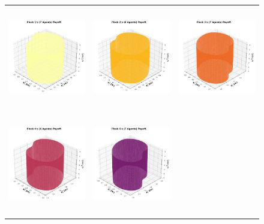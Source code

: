 \begin{figure}[tb!]
	\centering
	\begin{tabular}{ccc} 
		\includegraphics[height=12em,width=10em]{figures/flock_1.jpg} 
		&
		\includegraphics[height=12em,width=10em]{figures/flock_2.jpg} 
		& 
		\includegraphics[height=12em,width=10em]{figures/flock_3.jpg} 
		\\	
		\includegraphics[height=12em,width=10em]{figures/flock_4.jpg}
		&
		\includegraphics[height=12em,width=10em]{figures/flock_5.jpg} 

\end{tabular}
\end{figure}
